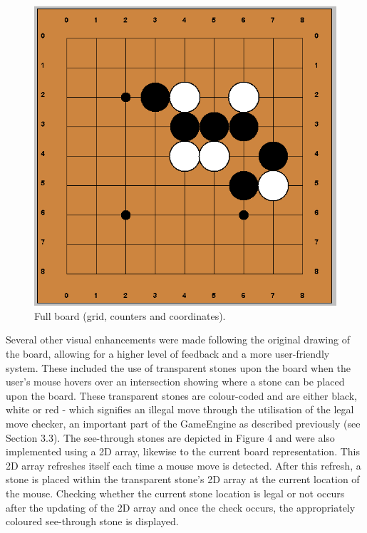 \documentclass{l3proj}
\begin{document}
\begin{figure}[H]
\centering
\includegraphics[scale=0.5]{Images/GUI-3-CountersCoords.png}
\caption{Full board (grid, counters and coordinates).}
\end{figure}

Several other visual enhancements were made following the original drawing of the board, allowing for a higher level of feedback and a more user-friendly system. These included the use of transparent stones upon the board when the user's mouse hovers over an intersection showing where a stone can be placed upon the board. These transparent stones are colour-coded and are either black, white or red - which signifies an illegal move through the utilisation of the legal move checker, an important part of the GameEngine as described previously (see Section 3.3). The see-through stones are depicted in Figure 4 and were also implemented using a 2D array, likewise to the current board representation. This 2D array refreshes itself each time a mouse move is detected. After this refresh, a stone is placed within the transparent stone's 2D array at the current location of the mouse. Checking whether the current stone location is legal or not occurs after the updating of the 2D array and once the check occurs, the appropriately coloured see-through stone is displayed.
\end{document}
